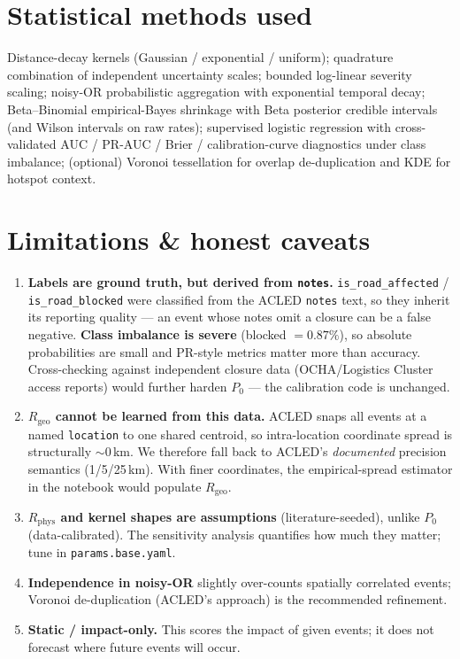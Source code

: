 \documentclass[11pt,a4paper]{article}
\newcommand{\code}[1]{\texttt{\small #1}}
\newcommand{\Rphys}{R_{\mathrm{phys}}}
\newcommand{\Rgeo}{R_{\mathrm{geo}}}
\begin{document}
\section{Statistical methods used}

Distance-decay kernels (Gaussian / exponential / uniform); quadrature combination of
independent uncertainty scales; bounded log-linear severity scaling; noisy-OR probabilistic
aggregation with exponential temporal decay; Beta--Binomial empirical-Bayes shrinkage with Beta
posterior credible intervals (and Wilson intervals on raw rates); supervised logistic regression
with cross-validated AUC / PR-AUC / Brier / calibration-curve diagnostics under class imbalance;
(optional) Voronoi tessellation for overlap de-duplication and KDE for hotspot context.

\section{Limitations \& honest caveats}

\begin{enumerate}[leftmargin=1.6em]
  \item \textbf{Labels are ground truth, but derived from \code{notes}.} \code{is\_road\_affected}
        / \code{is\_road\_blocked} were classified from the ACLED \code{notes} text, so they
        inherit its reporting quality --- an event whose notes omit a closure can be a false
        negative. \textbf{Class imbalance is severe} (blocked $=0.87\%$), so absolute
        probabilities are small and PR-style metrics matter more than accuracy. Cross-checking
        against independent closure data (OCHA/Logistics Cluster access reports) would further
        harden $P_0$ --- the calibration code is unchanged.
  \item \textbf{$\Rgeo$ cannot be learned from this data.} ACLED snaps all events at a named
        \code{location} to one shared centroid, so intra-location coordinate spread is
        structurally $\sim$0\,km. We therefore fall back to ACLED's \emph{documented} precision
        semantics (1/5/25\,km). With finer coordinates, the empirical-spread estimator in the
        notebook would populate $\Rgeo$.
  \item \textbf{$\Rphys$ and kernel shapes are assumptions} (literature-seeded), unlike $P_0$
        (data-calibrated). The sensitivity analysis quantifies how much they matter; tune in
        \code{params.base.yaml}.
  \item \textbf{Independence in noisy-OR} slightly over-counts spatially correlated events;
        Voronoi de-duplication (ACLED's approach) is the recommended refinement.
  \item \textbf{Static / impact-only.} This scores the impact of given events; it does not
        forecast where future events will occur.
\end{enumerate}
\end{document}

